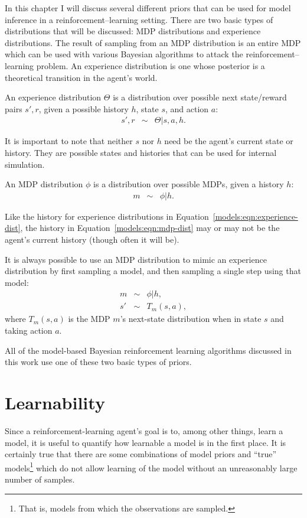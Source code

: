 In this chapter I will discuss several different priors that can be used for model inference in a reinforcement--learning setting. There are two basic types of distributions that will be discussed: MDP distributions and experience distributions. The result of sampling from an MDP distribution is an entire MDP which can be used with various Bayesian algorithms to attack the reinforcement--learning problem. An experience distribution is one whose posterior is a theoretical transition in the agent's world.

An experience distribution $\Theta$ is a distribution over possible next state/reward pairs $s',r$, given a possible history $h$, state $s$, and action $a$:
\begin{eqnarray}
\label{models:eqn:experience-dist} s', r &\sim& \Theta | s, a, h.
\end{eqnarray}

It is important to note that neither $s$ nor $h$ need be the agent's current state or history. They are possible states and histories that can be used for internal simulation.

An MDP distribution $\phi$ is a distribution over possible MDPs, given a history $h$:
\begin{eqnarray}
\label{models:eqn:mdp-dist} m &\sim& \phi|h.
\end{eqnarray}

Like the history for experience distributions in Equation~\ref{models:eqn:experience-dist}, the history in Equation~\ref{models:eqn:mdp-dist} may or may not be the agent's current history (though often it will be).

It is always possible to use an MDP distribution to mimic an experience distribution by first sampling a model, and then sampling a single step using that model:
\begin{eqnarray}
m &\sim& \phi|h,\\
s' &\sim& T_m(s,a),
\end{eqnarray}
where $T_m(s,a)$ is the MDP $m$'s next-state distribution when in state $s$ and taking action $a$.

All of the model-based Bayesian reinforcement learning algorithms discussed in this work use one of these two basic types of priors.

\section{Learnability}

Since a reinforcement-learning agent's goal is to, among other things, learn a model, it is useful to quantify how learnable a model is in the first place. It is certainly true that there are some combinations of model priors and ``true'' models\footnote{That is, models from which the observations are sampled.} which do not allow learning of the model without an unreasonably large number of samples.


